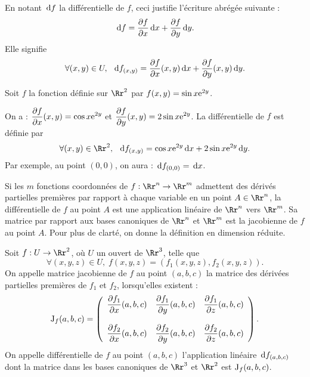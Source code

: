 \documentclass[class=report,crop=false]{standalone}
\begin{document}
\noindent En notant $\,\mathrm{d} f$ la différentielle de $f$, ceci justifie l'écriture abrégée suivante :
$$\,\mathrm{d} f=\frac{\partial f}{\partial x}\,\mathrm{d} x+\frac{\partial f}{\partial y}\,\mathrm{d} y.$$
Elle signifie
$$\forall (x,y)\in U,\;\; \,\mathrm{d} f_{(x,y)}=\frac{\partial f}{\partial x}(x,y)\,\mathrm{d} x+\frac{\partial f}{\partial y}(x,y)\,\mathrm{d} y.$$

\vskip6mm

Soit $f$ la fonction définie sur $\Rr^2$ par $f(x,y)=\sin x{\rm e} ^{2y}$.

\vskip3mm

\noindent On a : $\displaystyle \frac{\partial f}{\partial x}(x,y)=\cos x{\rm e} ^{2y}$ et $\displaystyle \frac{\partial f}{\partial y}(x,y)=2\sin x{\rm e} ^{2y}$. La différentielle de $f$ est définie  par
$$\forall (x,y)\in \Rr^2,\;\; \d f_{(x,y)}=\cos x\e ^{2y}\d x+2\sin x\e ^{2y}\d y.$$
Par exemple, au point $(0,0)$, on aura : $\,\mathrm{d} f_{(0,0)}=\,\mathrm{d} x$.

\vskip6mm

Si les $m$ fonctions coordonnées de $f:\Rr^n\to \Rr^m$ admettent des dérivés partielles premières par rapport à chaque variable en un point $A\in \Rr^n$, la différentielle de $f$ au point $A$ est une application linéaire de $\Rr^n$ vers $\Rr^m$. Sa matrice par rapport aux bases canoniques de $\Rr^n$ et $\Rr^m$ est la jacobienne de $f$ au point $A$. Pour plus de clarté, on donne la définition en dimension réduite.

\vskip6mm

\begin{definition}Soit $f:U\to \Rr^2$, o\`u $U$ un ouvert de $\Rr^3$, telle que
$$\forall (x,y,z)\in U,\; f(x,y,z)=(f_1(x,y,z),f_2(x,y,z)).$$
On appelle matrice jacobienne de $f$ au point $(a,b,c)$ la matrice des dérivées partielles premières de $f_1$ et $f_2$, lorsqu'elles existent :
$$\mathrm{J} _f(a,b,c)=\left(\begin{array}{ccc}\displaystyle \frac{\partial f_1}{\partial x}(a,b,c) &\displaystyle \frac{\partial f_1}{\partial y}(a,b,c)&\displaystyle \frac{\partial f_1}{\partial z}(a,b,c)\\ \\ \displaystyle \frac{\partial f_2}{\partial x}(a,b,c) &\displaystyle \frac{\partial f_2}{\partial y}(a,b,c)&\displaystyle \frac{\partial f_2}{\partial z}(a,b,c) \end{array}\right).$$
On appelle différentielle de $f$ au point $(a,b,c)$ l'application linéaire $\,\mathrm{d} f_{(a,b,c)}$ dont la matrice dans les bases canoniques de $\Rr^3$ et $\Rr^2$ est $\mathrm{J} _f(a,b,c)$.
\end{definition}
\end{document}
